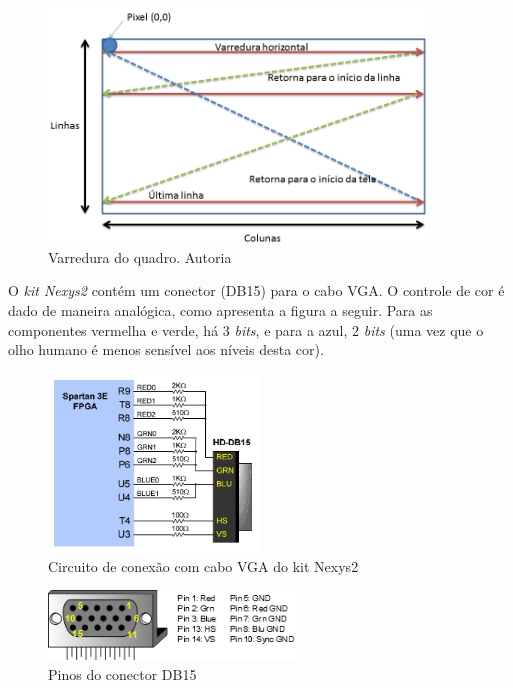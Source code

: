 \documentclass[12pt]{article}
\begin{document}
\begin{figure}[!h]
    \centering
    \includegraphics[width=0.9\textwidth]{img/controlador-vga-varredura-quadro-vga.png}
    \caption{Varredura do quadro. Autoria \cite{vga-sync}}
    \label{fig:vga-frame-sync}
\end{figure}

O \emph{kit Nexys2} contém um conector (DB15) para o cabo VGA. O controle de cor é dado de maneira analógica, como apresenta a figura a seguir. Para as componentes vermelha e verde, há 3 \emph{bits}, e para a azul, 2 \emph{bits} (uma vez que o olho humano é menos sensível aos níveis desta cor).

\clearpage

\begin{figure}[!h]
    \centering
    \includegraphics[width=0.5\textwidth]{img/rgb.jpg}
    \caption{Circuito de conexão com cabo VGA do kit Nexys2}
\end{figure}

\begin{figure}[!h]
    \centering
    \includegraphics[width=0.6\textwidth]{img/VGA_Connector.jpg}
    \caption{Pinos do conector DB15}
\end{figure}
\end{document}

